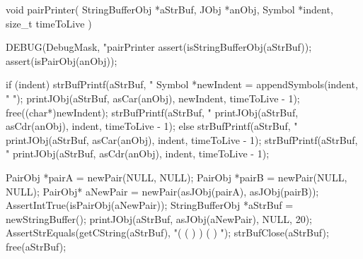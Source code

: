 \startCCode
void pairPrinter(
  StringBufferObj *aStrBuf,
  JObj            *anObj,
  Symbol          *indent,
  size_t           timeToLive
) {
  DEBUG(DebugMask, "pairPrinter %
  assert(isStringBufferObj(aStrBuf));
  assert(isPairObj(anObj));
  
  if (indent) {
    strBufPrintf(aStrBuf, "%
    Symbol *newIndent = appendSymbols(indent, "  ");
    printJObj(aStrBuf, asCar(anObj), newIndent, timeToLive - 1);
    free((char*)newIndent);
    strBufPrintf(aStrBuf, "%
    printJObj(aStrBuf, asCdr(anObj), indent, timeToLive - 1);
  } else {
    strBufPrintf(aStrBuf, "%
    printJObj(aStrBuf, asCar(anObj), indent, timeToLive - 1);
    strBufPrintf(aStrBuf, "%
    printJObj(aStrBuf, asCdr(anObj), indent, timeToLive - 1);
  }
  
}
\stopCCode


\startCTest
  PairObj *pairA = newPair(NULL, NULL);
  PairObj *pairB = newPair(NULL, NULL);
  PairObj* aNewPair = newPair(asJObj(pairA), asJObj(pairB));
  AssertIntTrue(isPairObj(aNewPair));
  StringBufferObj *aStrBuf = newStringBuffer();
  printJObj(aStrBuf, asJObj(aNewPair), NULL, 20);
  AssertStrEquals(getCString(aStrBuf), "( (  )  ) (  )  ");
  strBufClose(aStrBuf);
  free(aStrBuf);
\stopCTest
\stopTestCase
\stopTestSuite

